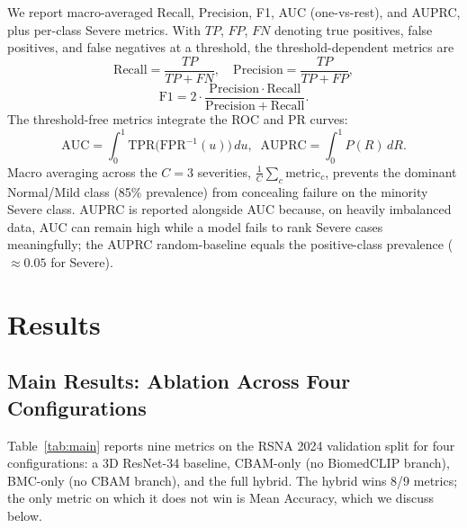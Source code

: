 \documentclass[conference]{IEEEtran}
\begin{document}
We report macro-averaged Recall, Precision, F1, AUC (one-vs-rest), and
AUPRC, plus per-class Severe metrics. With $TP$, $FP$, $FN$ denoting
true positives, false positives, and false negatives at a threshold,
the threshold-dependent metrics are
\begin{equation}
\mathrm{Recall} = \frac{TP}{TP + FN},\quad
\mathrm{Precision} = \frac{TP}{TP + FP},
\label{eq:recprec}
\end{equation}
\begin{equation}
\mathrm{F1} = 2\cdot\frac{\mathrm{Precision}\cdot\mathrm{Recall}}
                         {\mathrm{Precision} + \mathrm{Recall}}.
\label{eq:f1}
\end{equation}
The threshold-free metrics integrate the ROC and PR curves:
\begin{equation}
\mathrm{AUC} = \int_{0}^{1} \mathrm{TPR}\!\big(\mathrm{FPR}^{-1}(u)\big)\,du,
\;\;
\mathrm{AUPRC} = \int_{0}^{1} P(R)\,dR.
\label{eq:auc_auprc}
\end{equation}
Macro averaging across the $C{=}3$ severities, $\frac{1}{C}\sum_{c}
\mathrm{metric}_c$, prevents the dominant Normal/Mild class (85\%
prevalence) from concealing failure on the minority Severe class. AUPRC
is reported alongside AUC because, on heavily imbalanced data, AUC can
remain high while a model fails to rank Severe cases meaningfully; the
AUPRC random-baseline equals the positive-class prevalence
($\approx 0.05$ for Severe).

\section{Results}
\label{sec:results}

\subsection{Main Results: Ablation Across Four Configurations}

Table~\ref{tab:main} reports nine metrics on the RSNA 2024 validation
split for four configurations: a 3D ResNet-34 baseline, CBAM-only
(no BiomedCLIP branch), BMC-only (no CBAM branch), and the full
hybrid. The hybrid wins 8/9 metrics; the only metric on which it does
not win is Mean Accuracy, which we discuss below.
\end{document}
